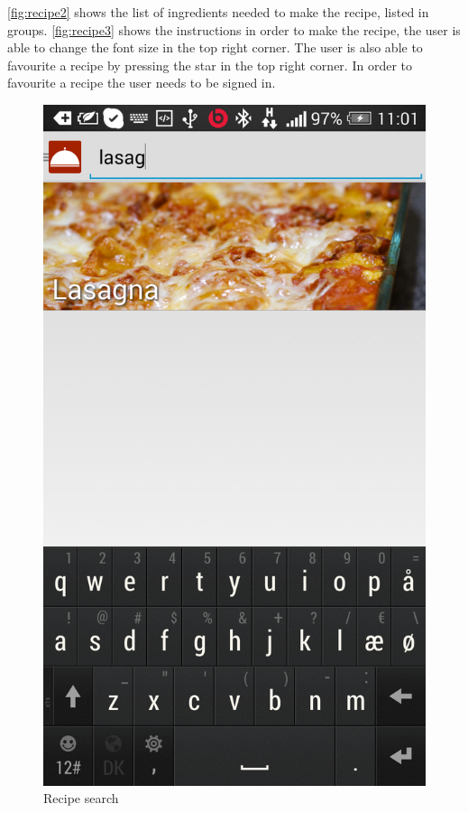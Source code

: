 \autoref{fig:recipe2} shows the list of ingredients needed to make the recipe, listed in groups. \autoref{fig:recipe3} shows the instructions in order to make the recipe, the user is able to change the font size in the top right corner. The user is also able to favourite a recipe by pressing the star in the top right corner. In order to favourite a recipe the user needs to be signed in.

\begin{figure}[H]
\begin{minipage}[t]{0.5\columnwidth}
\centering
\includegraphics[width=0.7\columnwidth]{img/screenshots/finalrecipesearch.png}
\caption{Recipe search\label{fig:recipesearch}}
\end{minipage}
\hspace{0.5cm}
\begin{minipage}[t]{0.5\columnwidth}
\centering

\end{minipage}
\end{figure}
